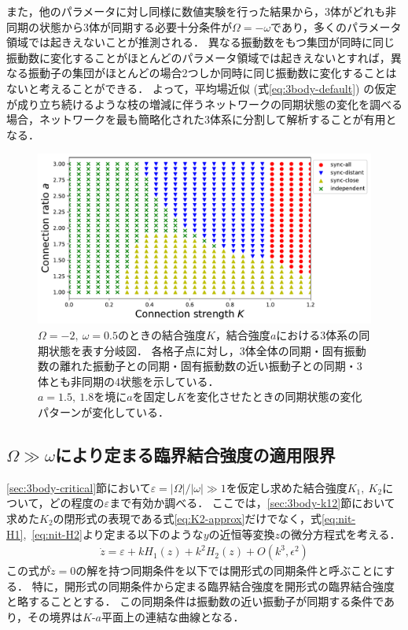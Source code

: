 \documentclass[../main]{subfiles}
\begin{document}
また，他のパラメータに対し同様に数値実験を行った結果から，3体がどれも非同期の状態から3体が同期する必要十分条件が$\Omega=-\omega$であり，多くのパラメータ領域では起きえないことが推測される．
異なる振動数をもつ集団が同時に同じ振動数に変化することがほとんどのパラメータ領域では起きえないとすれば，異なる振動子の集団がほとんどの場合2つしか同時に同じ振動数に変化することはないと考えることができる．
よって，平均場近似 (式\eqref{eq:3body-default}) の仮定が成り立ち続けるような枝の増減に伴うネットワークの同期状態の変化を調べる場合，ネットワークを最も簡略化された3体系に分割して解析することが有用となる．
\begin{figure}[tbp]
\centering
\includegraphics[width=135mm]{./images/three-body-phase-boundary.pdf}
\centering
\caption{$\Omega=-2,\ \omega=0.5$のときの結合強度$K$，結合強度$a$における3体系の同期状態を表す分岐図．
各格子点に対し，3体全体の同期・固有振動数の離れた振動子との同期・固有振動数の近い振動子との同期・3体とも非同期の4状態を示している．\\
$a=1.5,\ 1.8$を境に$a$を固定し$K$を変化させたときの同期状態の変化パターンが変化している．}
\label{fig:3body-phase-boundary}
\end{figure}
\subsection{$\Omega\gg\omega$により定まる臨界結合強度の適用限界}
\ref{sec:3body-critical}節において$\varepsilon=|\Omega|/|\omega|\gg 1$を仮定し求めた結合強度$K_1,\ K_2$について，どの程度の$\varepsilon$まで有効か調べる．
ここでは，\ref{sec:3body-k12}節において求めた$K_2$の閉形式の表現である式\eqref{eq:K2-approx}だけでなく，式\eqref{eq:nit-H1},\ \eqref{eq:nit-H2}より定まる以下のような$y$の近恒等変換$z$の微分方程式を考える．
\begin{align}
    \label{eq:k1k2-open}
    \dot{z}=\varepsilon+kH_1(z)+k^2H_2(z)+O(k^3,\epsilon^2)
\end{align}
この式が$\dot{z}=0$の解を持つ同期条件を以下では開形式の同期条件と呼ぶことにする．
特に，開形式の同期条件から定まる臨界結合強度を開形式の臨界結合強度と略することとする．
この同期条件は振動数の近い振動子が同期する条件であり，その境界は$K$-$a$平面上の連結な曲線となる．
\end{document}
